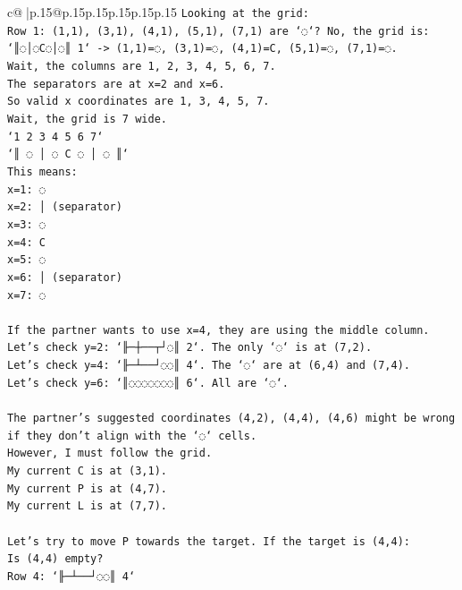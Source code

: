 \documentclass{article}
\begin{document}
{\begin{supertabular}{c@{$\;$}|p{.15\linewidth}@{}p{.15\linewidth}p{.15\linewidth}p{.15\linewidth}p{.15\linewidth}p{.15\linewidth}}
{{{\texttt{Looking at the grid:} \\
\texttt{Row 1: (1,1), (3,1), (4,1), (5,1), (7,1) are `◌`? No, the grid is:} \\
\texttt{`║◌│◌C◌│◌║ 1` {-}> (1,1)=◌, (3,1)=◌, (4,1)=C, (5,1)=◌, (7,1)=◌.} \\
\texttt{Wait, the columns are 1, 2, 3, 4, 5, 6, 7.} \\
\texttt{The separators are at x=2 and x=6.} \\
\texttt{So valid x coordinates are 1, 3, 4, 5, 7.} \\
\texttt{Wait, the grid is 7 wide.} \\
\texttt{`1 2 3 4 5 6 7`} \\
\texttt{`║ ◌ │ ◌ C ◌ │ ◌ ║`} \\
\texttt{This means:} \\
\texttt{x=1: ◌} \\
\texttt{x=2: │ (separator)} \\
\texttt{x=3: ◌} \\
\texttt{x=4: C} \\
\texttt{x=5: ◌} \\
\texttt{x=6: │ (separator)} \\
\texttt{x=7: ◌} \\
\\ 
\texttt{If the partner wants to use x=4, they are using the middle column.} \\
\texttt{Let's check y=2: `╟─┼──┬┘◌║ 2`. The only `◌` is at (7,2).} \\
\texttt{Let's check y=4: `╟─┴──┘◌◌║ 4`. The `◌` are at (6,4) and (7,4).} \\
\texttt{Let's check y=6: `║◌◌◌◌◌◌◌║ 6`. All are `◌`.} \\
\\ 
\texttt{The partner's suggested coordinates (4,2), (4,4), (4,6) might be wrong if they don't align with the `◌` cells.} \\
\texttt{However, I must follow the grid.} \\
\texttt{My current C is at (3,1).} \\
\texttt{My current P is at (4,7).} \\
\texttt{My current L is at (7,7).} \\
\\ 
\texttt{Let's try to move P towards the target. If the target is (4,4):} \\
\texttt{Is (4,4) empty?} \\
\texttt{Row 4: `╟─┴──┘◌◌║ 4`} \\
}}}
\end{supertabular}}
\end{document}

